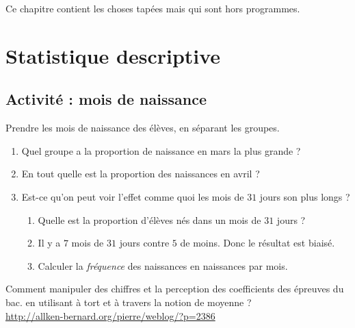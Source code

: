 
Ce chapitre contient les choses tapées mais qui sont hors programmes.

\section{Statistique descriptive}

\subsection{Activité : mois de naissance}

Prendre les mois de naissance des élèves, en séparant les groupes.
\begin{enumerate}
    \item
        Quel groupe a la proportion de naissance en mars la plus grande ?
    \item
        En tout quelle est la proportion des naissances en avril ?
    \item 
        Est-ce qu'on peut voir l'effet comme quoi les mois de \( 31\) jours son plus longs ? 
        \begin{enumerate}
            \item
                Quelle est la proportion d'élèves nés dans un mois de \( 31\) jours ?
            \item
                Il y a \( 7\) mois de $31$ jours contre \( 5\) de moins. Donc le résultat est biaisé.
            \item
                Calculer la \emph{fréquence} des naissances en naissances par mois.
        \end{enumerate}
\end{enumerate}


\begin{example}
    Comment manipuler des chiffres et la perception des coefficients des épreuves du bac. en utilisant à tort et à travers la notion de moyenne ?\\
    \url{http://allken-bernard.org/pierre/weblog/?p=2386}
\end{example}



